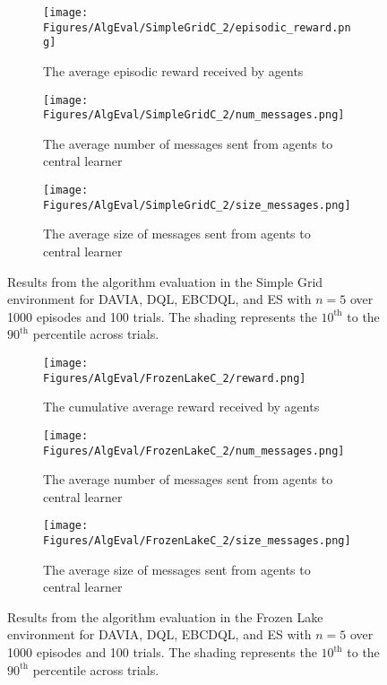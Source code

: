 \begin{figure}[H]
    \centering
    \begin{subfigure}{0.5\textwidth}
        \centering
        \texttt{[image: Figures/AlgEval/SimpleGridC\_2/episodic\_reward.png]}
        \caption{The average episodic reward received by agents}
        \label{fig:EvalSGReward}
    \end{subfigure}
    \begin{subfigure}{0.5\textwidth}
        \centering
        \texttt{[image: Figures/AlgEval/SimpleGridC\_2/num\_messages.png]}
        \caption{The average number of messages sent from agents to central learner}
        \label{fig:EvalSGNumMessages}
    \end{subfigure}
    \begin{subfigure}{0.5\textwidth}
        \centering
        \texttt{[image: Figures/AlgEval/SimpleGridC\_2/size\_messages.png]}
        \caption{The average size of messages sent from agents to central learner}
        \label{fig:EvalSGSizeMessages}
    \end{subfigure}
    \caption{Results from the algorithm evaluation in the Simple Grid environment for DAVIA, DQL, EBCDQL, and ES with $n=5$ over 1000 episodes and 100 trials. The shading represents the $10^\text{th}$ to the $90^{\text{th}}$ percentile across trials.}
    \label{fig:EvalSG}
\end{figure}

\begin{figure}[H]
    \centering
    \begin{subfigure}{0.5\textwidth}
        \centering
        \texttt{[image: Figures/AlgEval/FrozenLakeC\_2/reward.png]}
        \caption{The cumulative average reward received by agents}
        \label{fig:EvalFLReward}
    \end{subfigure}
    \begin{subfigure}{0.5\textwidth}
        \centering
        \texttt{[image: Figures/AlgEval/FrozenLakeC\_2/num\_messages.png]}
        \caption{The average number of messages sent from agents to central learner}
        \label{fig:EvalFLNumMessages}
    \end{subfigure}
    \begin{subfigure}{0.5\textwidth}
        \centering
        \texttt{[image: Figures/AlgEval/FrozenLakeC\_2/size\_messages.png]}
        \caption{The average size of messages sent from agents to central learner}
        \label{fig:EvalFLSizeMessages}
    \end{subfigure}
    \caption{Results from the algorithm evaluation in the Frozen Lake environment for DAVIA, DQL, EBCDQL, and ES with $n=5$ over 1000 episodes and 100 trials. The shading represents the $10^\text{th}$ to the $90^{\text{th}}$ percentile across trials.}
    \label{fig:EvalFL}
\end{figure}

